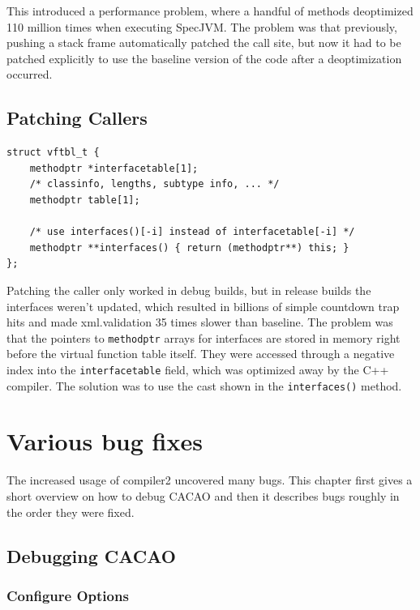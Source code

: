 \documentclass[draft,final]{vutinfth} %
\begin{document}
    This introduced a performance problem,
    where a handful of methods deoptimized 110 million times when executing SpecJVM.
    The problem was that previously,
    pushing a stack frame automatically patched the call site,
    but now it had to be patched explicitly
    to use the baseline version of the code
    after a deoptimization occurred.


    \section{Patching Callers}

    \begin{lstlisting}
struct vftbl_t {
    methodptr *interfacetable[1];
    /* classinfo, lengths, subtype info, ... */
    methodptr table[1];

    /* use interfaces()[-i] instead of interfacetable[-i] */
    methodptr **interfaces() { return (methodptr**) this; }
};
    \end{lstlisting}

    Patching the caller only worked in debug builds, but in release builds the interfaces weren't updated,
    which resulted in billions of simple countdown trap hits
    and made xml.validation 35 times slower than baseline.
    The problem was that the pointers to \lstinline{methodptr} arrays for interfaces are
    stored in memory right before the virtual function table itself.
    They were accessed through a negative index into the \lstinline{interfacetable} field,
    which was optimized away by the C++ compiler.
    The solution was to use the cast shown in the \lstinline{interfaces()} method.


    \chapter{Various bug fixes}

    The increased usage of compiler2 uncovered many bugs.
    This chapter first gives a short overview on how to debug CACAO
    and then it describes bugs roughly in the order they were fixed.


    \section{Debugging CACAO}

    \subsection{Configure Options}
\end{document}
